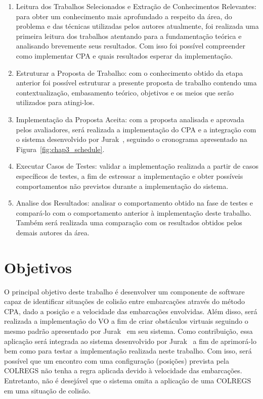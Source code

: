\begin{enumerate}[label=\alph*)]
            \item Leitura dos Trabalhos Selecionados e Extração de Conhecimentos Relevantes: para obter um conhecimento mais aprofundado a respeito da área, do problema e das técnicas utilizadas pelos autores atualmente, foi realizada uma primeira leitura dos trabalhos atentando para a fundamentação teórica e analisando brevemente seus resultados. Com isso foi possível compreender como implementar CPA e quais resultados esperar da implementação.
            
            \item Estruturar a Proposta de Trabalho: com o conhecimento obtido da etapa anterior foi possível estruturar a presente proposta de trabalho contendo uma contextualização, embasamento teórico, objetivos e os meios que serão utilizados para atingi-los.
            
            \item Implementação da Proposta Aceita: com a proposta analisada e aprovada pelos avaliadores, será realizada a implementação do CPA e a integração com o sistema desenvolvido por Jurak~\cite{JURAK2020}, seguindo o cronograma apresentado na Figura~\ref{fig:chap3_schedule}.
            
            \item Executar Casos de Testes: validar a implementação realizada a partir de casos específicos de testes, a fim de estressar a implementação e obter possíveis comportamentos não previstos durante a implementação do sistema.
            
            \item Analise dos Resultados: analisar o comportamento obtido na fase de testes e compará-lo com o comportamento anterior à implementação deste trabalho. Também será realizada uma comparação com os resultados obtidos pelos demais autores da área. 
        \end{enumerate}
        
    \section{Objetivos}
        O principal objetivo deste trabalho é desenvolver um componente de software capaz de identificar situações de colisão entre embarcações através do método CPA, dado a posição e a velocidade das embarcações envolvidas. Além disso, será realizada a implementação do VO a fim de criar obstáculos virtuais seguindo o mesmo padrão apresentado por Jurak~\cite{JURAK2020} em seu sistema. Como contribuição, essa aplicação será integrada ao sistema desenvolvido por Jurak~\cite{JURAK2020} a fim de aprimorá-lo bem como para testar a implementação realizada neste trabalho. Com isso, será possível que um encontro com uma configuração (posições) prevista pela COLREGS não tenha a regra aplicada devido à velocidade das embarcações. Entretanto, não é desejável que o sistema omita a aplicação de uma COLREGS em uma situação de colisão. 
        
